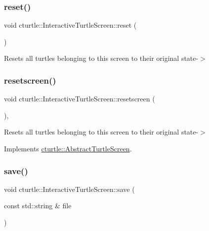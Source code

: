 \subsubsection{\texorpdfstring{reset()}{reset()}}
{\footnotesize\ttfamily void cturtle\+::\+Interactive\+Turtle\+Screen\+::reset (\begin{DoxyParamCaption}{ }\end{DoxyParamCaption})\hspace{0.3cm}{\ttfamily [inline]}}

Resets all turtles belonging to this screen to their original state-\/$>$ \mbox{\label{classcturtle_1_1InteractiveTurtleScreen_a06471bf6c8c02768fb0acd89649c72c2}} 
\subsubsection{\texorpdfstring{resetscreen()}{resetscreen()}}
{\footnotesize\ttfamily void cturtle\+::\+Interactive\+Turtle\+Screen\+::resetscreen (\begin{DoxyParamCaption}{ }\end{DoxyParamCaption})\hspace{0.3cm}{\ttfamily [inline]}, {\ttfamily [virtual]}}

Resets all turtles belonging to this screen to their original state-\/$>$ 

Implements \hyperlink{classcturtle_1_1AbstractTurtleScreen}{cturtle\+::\+Abstract\+Turtle\+Screen}.

\mbox{\label{classcturtle_1_1InteractiveTurtleScreen_ab0ded9c577f523ca45240e036318553e}} 
\subsubsection{\texorpdfstring{save()}{save()}}
{\footnotesize\ttfamily void cturtle\+::\+Interactive\+Turtle\+Screen\+::save (\begin{DoxyParamCaption}\item[{const std\+::string \&}]{file }\end{DoxyParamCaption})\hspace{0.3cm}{\ttfamily [inline]}}


